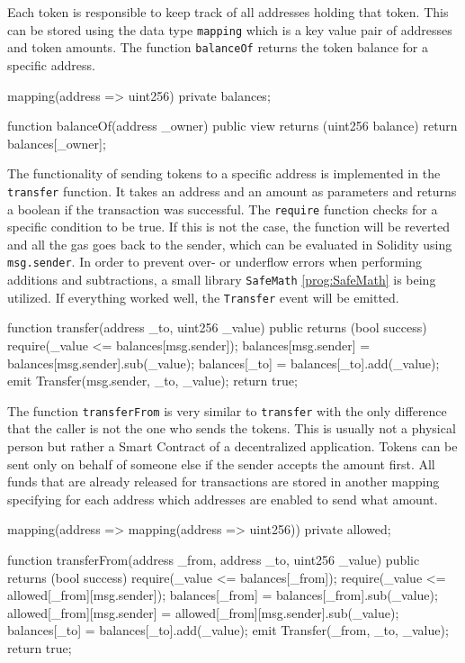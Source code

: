 Each token is responsible to keep track of all addresses holding that token. This can be stored using the data type \texttt{mapping} which is a key value pair of addresses and token amounts. The function \texttt{balanceOf} returns the token balance for a specific address.

\begin{GenericCode}
 mapping(address => uint256) private balances;
  
 function balanceOf(address _owner) public view returns (uint256 balance) {
   return balances[_owner];
 }
\end{GenericCode}

The functionality of sending tokens to a specific address is implemented in the \texttt{transfer} function. It takes an address and an amount as parameters and returns a boolean if the transaction was successful. The \texttt{require} function checks for a specific condition to be true. If this is not the case, the function will be reverted and all the gas goes back to the sender, which can be evaluated in Solidity using \texttt{msg.sender}. In order to prevent over- or underflow errors when performing additions and subtractions, a small library \texttt{SafeMath} \ref{prog:SafeMath} is being utilized. If everything worked well, the \texttt{Transfer} event will be emitted.

\begin{GenericCode}
function transfer(address _to, uint256 _value) public returns (bool success) {
  require(_value <= balances[msg.sender]);
  balances[msg.sender] = balances[msg.sender].sub(_value);
  balances[_to] = balances[_to].add(_value);
  emit Transfer(msg.sender, _to, _value);
  return true;
}
\end{GenericCode}

The function \texttt{transferFrom} is very similar to \texttt{transfer} with the only difference that the caller is not the one who sends the tokens. This is usually not a physical person but rather a Smart Contract of a decentralized application. Tokens can be sent only on behalf of someone else if the sender accepts the amount first. All funds that are already released for transactions are stored in another mapping specifying for each address which addresses are enabled to send what amount.

\begin{GenericCode}
mapping(address => mapping(address => uint256)) private allowed;

function transferFrom(address _from, address _to, uint256 _value) public returns (bool success) {
  require(_value <= balances[_from]);
  require(_value <= allowed[_from][msg.sender]);
  balances[_from] = balances[_from].sub(_value);
  allowed[_from][msg.sender] = allowed[_from][msg.sender].sub(_value);
  balances[_to] = balances[_to].add(_value);
  emit Transfer(_from, _to, _value);
  return true;
}
\end{GenericCode}

